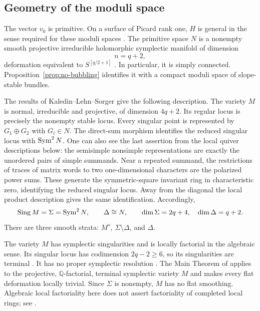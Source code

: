 \subsection{Geometry of the moduli space}
The vector $v_0$ is primitive. On a surface of Picard rank one,
$H$ is general in the sense required for these moduli spaces
\cite[Definition~2.8 and Lemma~2.9(1)]{pr23}. The primitive
space $N$ is a nonempty smooth projective irreducible
holomorphic symplectic manifold of dimension
\begin{equation}\label{eq:n}
 n=q+2,
\end{equation}
deformation equivalent to $S^{[q/2+1]}$
\cite[Theorem~1.7 and the paragraph following Definition~1.6]{pr23}.
In particular, it is simply connected. Proposition~\ref{prop:no-bubbling}
identifies it with a compact moduli space of slope-stable bundles.

The results of Kaledin--Lehn--Sorger
\cite[Theorem~4.4, Proposition~6.1 and Theorems~A--B]{kls06}
give the following description. The variety $M$ is normal,
irreducible and projective, of dimension $4q+2$. Its regular
locus is precisely the nonempty stable locus. Every singular
point is represented by $G_1\oplus G_2$ with $G_i\in N$.
The direct-sum morphism identifies the reduced singular locus
with $\operatorname{Sym}^2N$. One can also see the last assertion from the
local quiver descriptions below: the semisimple nonsimple
representations are exactly the unordered pairs of simple
summands. Near a repeated summand, the restrictions of traces
of matrix words to two one-dimensional characters are the
polarized power sums. These generate the symmetric-square
invariant ring in characteristic zero, identifying the
reduced singular locus. Away from the diagonal the local
product description gives the same identification. Accordingly,
\begin{equation}\label{eq:strata}
 \operatorname{Sing} M=\Sigma=\operatorname{Sym}^2N,\qquad
 \Delta\cong N,\qquad
 \dim\Sigma=2q+4,\quad \dim\Delta=q+2.
\end{equation}
There are three smooth strata: $M^s$, $\Sigma\setminus\Delta$,
and $\Delta$.

The variety $M$ has symplectic singularities and is locally
factorial in the algebraic sense. Its singular locus has
codimension $2q-2\ge6$, so its singularities are terminal
\cite[Corollary~1]{namikawa01}. It has no proper symplectic
resolution \cite[Theorem~B]{kls06}. The Main Theorem of
\cite{namikawa06} applies to the projective, $\mathbb Q$-factorial,
terminal symplectic variety $M$ and makes every flat deformation
locally trivial. Since $\Sigma$ is nonempty, $M$ has no flat
smoothing. Algebraic local factoriality here does not assert
factoriality of completed local rings; see
\cite[Remark~6.3]{kls06}.

